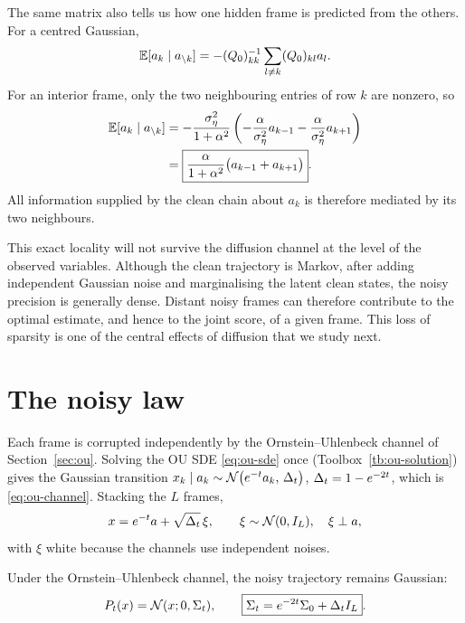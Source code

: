 The same matrix also tells us how one hidden frame is predicted from the
others. For a centred Gaussian,
\begin{equation}
  \mathbb{E}[a_k\mid a_{\setminus k}]
  =
  -(Q_0)_{kk}^{-1}
  \sum_{l\neq k}(Q_0)_{kl}a_l.
  \label{eq:g-gaussian-cond-precision}
\end{equation}
For an interior frame, only the two neighbouring entries of row $k$ are
nonzero, so
\begin{align}
  \mathbb{E}[a_k\mid a_{\setminus k}]
  &=
  -\frac{\sigma_\eta^2}{1+\alpha^2}
  \left(
    -\frac{\alpha}{\sigma_\eta^2}a_{k-1}
    -\frac{\alpha}{\sigma_\eta^2}a_{k+1}
  \right)\\
  &=
  \boxed{
  \frac{\alpha}{1+\alpha^2}
  \bigl(a_{k-1}+a_{k+1}\bigr)
  }.
  \label{eq:g-cond-mean}
\end{align}
All information supplied by the clean chain about $a_k$ is therefore
mediated by its two neighbours.

This exact locality will not survive the diffusion channel at the level of
the observed variables. Although the clean trajectory is Markov, after
adding independent Gaussian noise and marginalising the latent clean states,
the noisy precision is generally dense. Distant noisy frames can therefore
contribute to the optimal estimate, and hence to the joint score, of a given
frame. This loss of sparsity is one of the central effects of diffusion that
we study next.


\section{The noisy law}
\label{sec:g-noisy}

Each frame is corrupted independently by the Ornstein--Uhlenbeck channel of
Section~\ref{sec:ou}. Solving the OU SDE \eqref{eq:ou-sde} once
(Toolbox~\ref{tb:ou-solution}) gives the Gaussian transition
$x_k \mid a_k \sim \mathcal{N}\big(e^{-t} a_k,\, \Delta_t\big)$,
$\Delta_t = 1 - e^{-2t}$, which is \eqref{eq:ou-channel}. Stacking the $L$
frames,
\begin{equation}
  x = e^{-t} a + \sqrt{\Delta_t}\,\xi,
  \qquad
  \xi \sim \mathcal{N}(0, I_L),
  \quad \xi \perp a ,
  \label{eq:g-channel-vec}
\end{equation}
with $\xi$ white because the channels use independent noises.


\begin{proposition}\label{prop:g-Sigt}
Under the Ornstein--Uhlenbeck channel,
the noisy trajectory remains Gaussian:
\begin{equation}
  P_t(x)
  =
  \mathcal{N}(x;0,\Sigma_t),
  \qquad
  \boxed{
  \Sigma_t
  =
  e^{-2t}\Sigma_0+\Delta_t I_L
  }.
  \label{eq:g-Sigt}
\end{equation}
\end{proposition}

